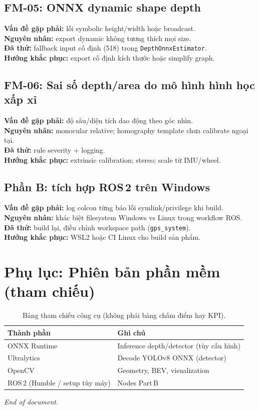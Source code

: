 \documentclass[12pt,a4paper]{article}
\begin{document}
\subsection*{FM-05: ONNX dynamic shape depth}
\textbf{Vấn đề gặp phải:} lỗi symbolic height/width hoặc broadcast.\\
\textbf{Nguyên nhân:} export dynamic không tương thích mọi size.\\
\textbf{Đã thử:} fallback input cố định (518) trong \texttt{DepthOnnxEstimator}.\\
\textbf{Hướng khắc phục:} export cố định kích thước hoặc simplify graph.

\subsection*{FM-06: Sai số depth/area do mô hình hình học xấp xỉ}
\textbf{Vấn đề gặp phải:} độ sâu/diện tích dao động theo góc nhìn.\\
\textbf{Nguyên nhân:} monocular relative; homography template chưa calibrate ngoại tại.\\
\textbf{Đã thử:} rule severity + logging.\\
\textbf{Hướng khắc phục:} extrinsic calibration; stereo; scale từ IMU/wheel.

\subsection*{Phần B: tích hợp ROS\,2 trên Windows}
\textbf{Vấn đề gặp phải:} log colcon từng báo lỗi symlink/privilege khi build.\\
\textbf{Nguyên nhân:} khác biệt filesystem Windows vs Linux trong workflow ROS.\\
\textbf{Đã thử:} build lại, điều chỉnh workspace path (\texttt{gps\_system}).\\
\textbf{Hướng khắc phục:} WSL2 hoặc CI Linux cho build sản phẩm.

\section*{Phụ lục: Phiên bản phần mềm (tham chiếu)}
\begin{table}[H]
\centering
\begin{tabular}{@{}ll@{}}
\toprule
Thành phần & Ghi chú \\
\midrule
ONNX Runtime & Inference depth/detector (tùy cấu hình) \\
Ultralytics & Decode YOLOv8 ONNX (detector) \\
OpenCV & Geometry, BEV, visualization \\
ROS\,2 (Humble / setup tùy máy) & Nodes Part\,B \\
\bottomrule
\end{tabular}
\caption{Bảng tham chiếu công cụ (không phải bảng chấm điểm hay KPI).}
\end{table}

\vfill
\noindent\textit{End of document.}
\end{document}

